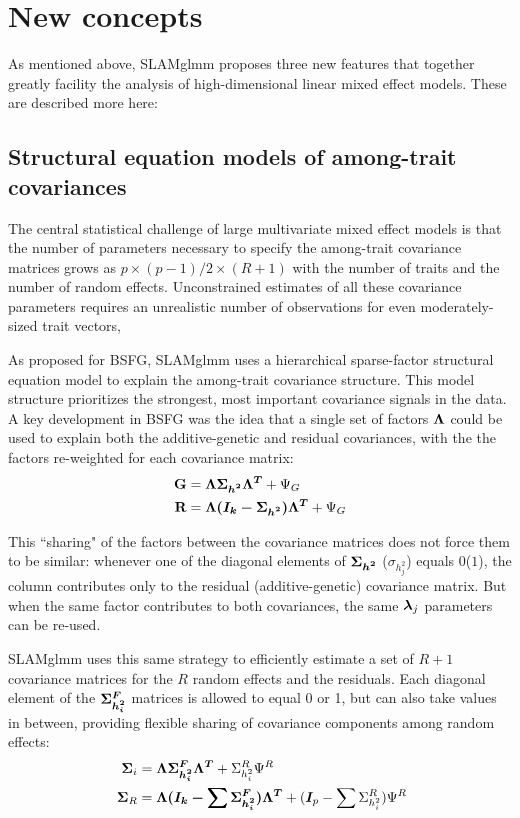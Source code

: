 \documentclass[11pt]{amsart}
\newcommand*{\B}[1]{\ifmmode\bm{#1}\else\textbf{#1}\fi}
\begin{document}
\section{New concepts}
As mentioned above, SLAMglmm proposes three new features that together greatly facility the analysis of high-dimensional linear mixed effect models. These are described more here:

\subsection{Structural equation models of among-trait covariances}
The central statistical challenge of large multivariate mixed effect models is that the number of parameters necessary to specify the among-trait covariance matrices grows as $p\times(p-1)/2 \times (R+1)$ with the number of traits and the number of random effects. Unconstrained estimates of all these covariance parameters requires an unrealistic number of observations for even moderately-sized trait vectors,

As proposed for BSFG, SLAMglmm uses a hierarchical sparse-factor structural equation model to explain the among-trait covariance structure. This model structure prioritizes the strongest, most important covariance signals in the data. A key development in BSFG was the idea that a single set of factors $\B{\Lambda}$ could be used to explain both the additive-genetic and residual covariances, with the the factors re-weighted for each covariance matrix:
\begin{align}\begin{split}
\B{G} &= \B{\Lambda \Sigma_{h^2} \Lambda^T} + \Psi_G \\
\B{R} &= \B{\Lambda (\B{I}_k - \Sigma_{h^2}) \Lambda^T} + \Psi_G \\
\end{split} \end{align}

This ``sharing" of the factors between the covariance matrices does not force them to be similar: whenever one of the diagonal elements of $\B{\Sigma_{h^2}}$ ($\sigma_{h^2_j}$) equals $0$($1$), the column contributes only to the residual (additive-genetic) covariance matrix. But when the same factor contributes to both covariances, the same $\B{\lambda}_j$ parameters can be re-used.

SLAMglmm uses this same strategy to efficiently estimate a set of $R+1$ covariance matrices for the $R$ random effects and the residuals. Each diagonal element of the $\B{\Sigma^F_{h^2_i}}$ matrices is allowed to equal 0 or 1, but can also take values in between, providing flexible sharing of covariance components among random effects:
\begin{align}\begin{split}
\;\B{\Sigma}_i &= \B{\Lambda \Sigma^F_{h^2_i} \Lambda^T} + \Sigma^R_{h^2_i}\Psi^R \\
\;\B{\Sigma}_R &= \B{\Lambda (\B{I}_k - \sum \Sigma^F_{h^2_i}) \Lambda^T} + (\B{I}_p - \sum \Sigma^R_{h^2_i})\Psi^R 
\end{split} \end{align}
\end{document}
